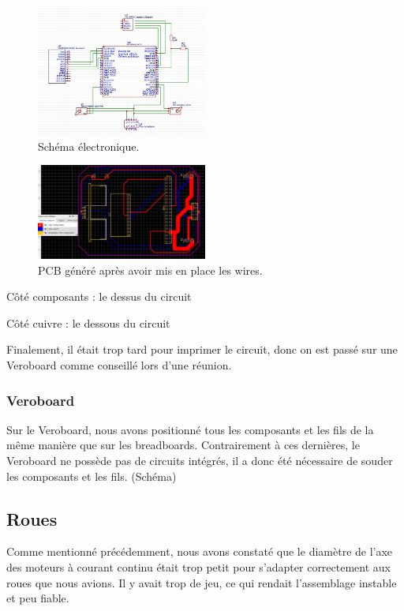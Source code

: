 \documentclass[a4paper,12pt]{report}  %
\begin{document}
\begin{figure}[H]
	\centering
	\includegraphics[width=0.5\textwidth]{./attachments/schema_elec.jpg}
	\caption{Schéma électronique.}
\end{figure}

\begin{figure}[H]
	\centering
	\includegraphics[width=0.5\textwidth]{./attachments/schema_pcb.jpg}
	\caption{PCB généré après avoir mis en place les wires.}
\end{figure}

Côté composants : le dessus du circuit 

Côté cuivre : le dessous du circuit



Finalement, il était trop tard pour imprimer le circuit, donc on est passé sur une Veroboard comme conseillé lors d’une réunion.

\subsubsection{Veroboard}
Sur le Veroboard, nous avons positionné tous les composants et les fils de la même manière que sur les breadboards. Contrairement à ces dernières, le Veroboard ne possède pas de circuits intégrés, il a donc été nécessaire de souder les composants et les fils.
(Schéma)



\subsection{Roues}
Comme mentionné précédemment, nous avons constaté que le diamètre de l’axe des moteurs à courant continu était trop petit pour s’adapter correctement aux roues que nous avions. Il y avait trop de jeu, ce qui rendait l’assemblage instable et peu fiable.
\end{document}
